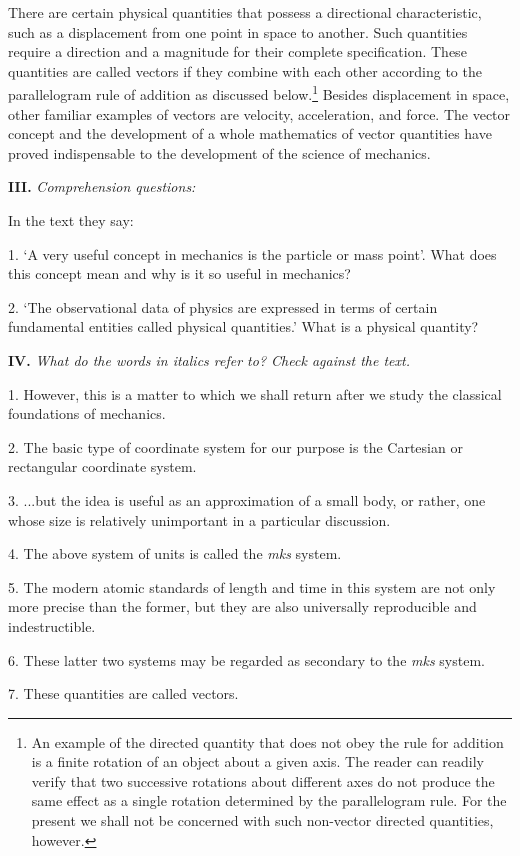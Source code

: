 \documentclass[a4paper]{article}
\newcommand{\ETask}[2]{\medskip\par\textbf{#1.} \textit{#2}\par}
\begin{document}
There are certain physical quantities that possess a directional characteristic, such as a displacement from one point in
space to another. Such quantities require a direction and a magnitude for their complete specification. These quantities are
called vectors if they combine with each other according to the parallelogram rule of addition as discussed below.\footnote{An
example of the directed quantity that does not obey the rule for addition is a finite rotation of an object about a given axis.
The reader can readily verify that two successive rotations about different axes do not produce the same effect as a single
rotation determined by the parallelogram rule. For the present we shall not be concerned with such non-vector directed quantities,
however.} Besides displacement in space, other familiar examples of vectors are velocity, acceleration, and force. The vector
concept and the development of a whole mathematics of vector quantities have proved indispensable to the development of the
science of mechanics.

\ETask{III}{Comprehension questions:}
In the text they say:

1. `A very useful concept in mechanics is the particle or mass point'. What does this concept mean and why is it so useful
in mechanics?

2. `The observational data of physics are expressed in terms of certain fundamental entities called physical quantities.'
What is a physical quantity?

\ETask{IV}{What do the words in italics refer to? Check against the text.}

1. However, this is a matter to which we shall return after we study the classical foundations of mechanics.

2. The basic type of coordinate system for our purpose is the Cartesian or rectangular coordinate system.

3. ...but the idea is useful as an approximation of a small body, or rather, one whose size is relatively unimportant in
a particular discussion.

4. The above system of units is called the \textit{mks} system.

5. The modern atomic standards of length and time in this system are not only more precise than the former, but they are
also universally reproducible and indestructible.

6. These latter two systems may be regarded as secondary to the \textit{mks} system.

7. These quantities are called vectors.
\end{document}
